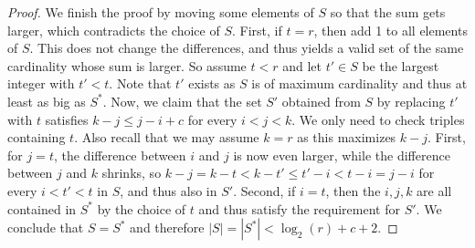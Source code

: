 \documentclass[a4paper,english,cleveref,thm-restate]{lipics-v2021}
\begin{document}
\begin{proof}
    We finish the proof by moving some elements of $ S $ so that the sum gets larger, which contradicts the choice of $ S $.
    First, if $ t = r $, then add 1 to all elements of $ S $.
    This does not change the differences, and thus yields a valid set of the same cardinality whose sum is larger.
    So assume $ t < r $ and let $ t' \in S $ be the largest integer with $ t' < t $.
    Note that $ t' $ exists as $ S $ is of maximum cardinality and thus at least as big as $ S^* $.
    Now, we claim that the set $ S' $ obtained from $ S $ by replacing $ t' $ with  $t$ satisfies $ k - j \leq j - i + c $ for every $ i < j < k $.
    We only need to check triples containing $ t $.
    Also recall that we may assume $ k = r $ as this maximizes $ k - j $.
    First, for $ j = t $, the difference between $ i $ and $ j $ is now even larger, while the difference between $ j $ and $ k $ shrinks, so $ k - j = k - t < k - t' \leq t' - i < t - i = j - i $ for every $ i < t' < t$ in $ S $, and thus also in $ S' $.
    Second, if $ i = t $, then the $ i, j, k $ are all contained in $ S^* $ by the choice of $ t $ and thus satisfy the requirement for $ S' $.
    We conclude that $ S = S^* $ and therefore $ |S| = |S^*| < \log_2(r) + c + 2 $.
\end{proof}



    
\end{document}
